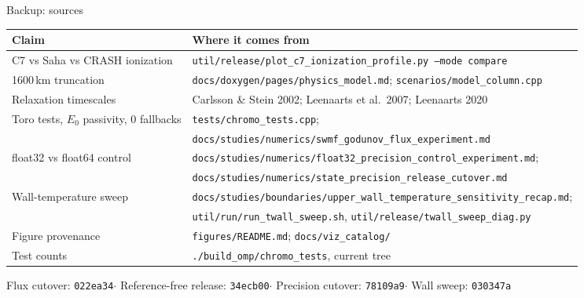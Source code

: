 \documentclass[aspectratio=169]{beamer}
\begin{document}
\begin{frame}{Backup: sources}
  \scriptsize
  \begin{tabular}{ll}
    \toprule
    Claim & Where it comes from \\
    \midrule
    C7 vs Saha vs CRASH ionization & \texttt{util/release/plot\_c7\_ionization\_profile.py --mode compare} \\
    1600\,km truncation & \texttt{docs/doxygen/pages/physics\_model.md}; \texttt{scenarios/model\_column.cpp} \\
    Relaxation timescales & Carlsson \& Stein 2002; Leenaarts et al.\ 2007; Leenaarts 2020 \\
    Toro tests, $E_0$ passivity, 0 fallbacks & \texttt{tests/chromo\_tests.cpp}; \\
      & \texttt{docs/studies/numerics/swmf\_godunov\_flux\_experiment.md} \\
    float32 vs float64 control & \texttt{docs/studies/numerics/float32\_precision\_control\_experiment.md}; \\
      & \texttt{docs/studies/numerics/state\_precision\_release\_cutover.md} \\
    Wall-temperature sweep & \texttt{docs/studies/boundaries/upper\_wall\_temperature\_sensitivity\_recap.md}; \\
      & \texttt{util/run/run\_twall\_sweep.sh}, \texttt{util/release/twall\_sweep\_diag.py} \\
    Figure provenance & \texttt{figures/README.md}; \texttt{docs/viz\_catalog/} \\
    Test counts & \texttt{./build\_omp/chromo\_tests}, current tree \\
    \bottomrule
  \end{tabular}
  \vspace{12pt}
  \begin{center}
    Flux cutover: \texttt{022ea34}\quad$\cdot$\quad
    Reference-free release: \texttt{34ecb00}\quad$\cdot$\quad
    Precision cutover: \texttt{78109a9}\quad$\cdot$\quad
    Wall sweep: \texttt{030347a}
  \end{center}
\end{frame}
\end{document}
